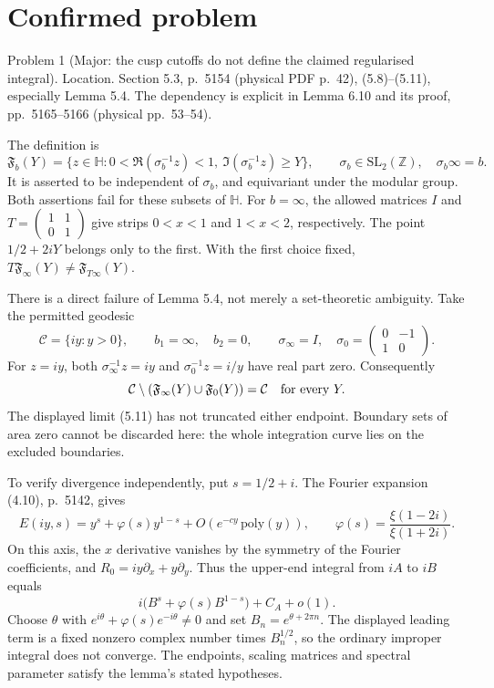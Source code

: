 \documentclass[10pt]{article}
\begin{document}
\section*{Confirmed problem}
Problem 1 (Major: the cusp cutoffs do not define the claimed regularised integral).  Location. Section 5.3, p. 5154 (physical PDF p. 42), (5.8)–(5.11), especially Lemma 5.4. The dependency is explicit in Lemma 6.10 and its proof, pp. 5165–5166 (physical pp. 53–54).\par
The definition is \[\mathfrak F_b(Y)=
 \{z\in\mathbb H:0<\Re(\sigma_b^{-1}z)<1,\
                         \Im(\sigma_b^{-1}z)\ge Y\},
 \qquad \sigma_b\in\mathrm{SL}_2(\mathbb Z),\quad\sigma_b\infty=b.\] It is asserted to be independent of \(\sigma_b\), and equivariant under the modular group. Both assertions fail for these subsets of \(\mathbb H\). For \(b=\infty\), the allowed matrices \(I\) and \(T=\left(\begin{smallmatrix}1&1\\0&1\end{smallmatrix}\right)\) give strips \(0<x<1\) and \(1<x<2\), respectively. The point \(1/2+2iY\) belongs only to the first. With the first choice fixed, \(T\mathfrak F_\infty(Y)\ne\mathfrak F_{T\infty}(Y)\).\par
There is a direct failure of Lemma 5.4, not merely a set-theoretic ambiguity. Take the permitted geodesic \[\mathcal C=\{iy:y>0\},\qquad b_1=\infty,\quad b_2=0,\qquad
 \sigma_\infty=I,\quad
 \sigma_0=\begin{pmatrix}0&-1\\1&0\end{pmatrix}.\] For \(z=iy\), both \(\sigma_\infty^{-1}z=iy\) and \(\sigma_0^{-1}z=i/y\) have real part zero. Consequently \[\mathcal C\setminus
       (\mathfrak F_\infty(Y)\cup\mathfrak F_0(Y))=\mathcal C
 \quad\hbox{for every }Y.\] The displayed limit (5.11) has not truncated either endpoint. Boundary sets of area zero cannot be discarded here: the whole integration curve lies on the excluded boundaries.\par
To verify divergence independently, put \(s=1/2+i\). The Fourier expansion (4.10), p. 5142, gives \[E(iy,s)=y^s+\varphi(s)y^{1-s}+O(e^{-c y}\,\mathrm{poly}(y)),
 \qquad
 \varphi(s)=\frac{\xi(1-2i)}{\xi(1+2i)}.\] On this axis, the \(x\) derivative vanishes by the symmetry of the Fourier coefficients, and \(R_0=iy\partial_x+y\partial_y\). Thus the upper-end integral from \(iA\) to \(iB\) equals \[i\bigl(B^s+\varphi(s)B^{1-s}\bigr)+C_A+o(1).\] Choose \(\theta\) with \(e^{i\theta}+\varphi(s)e^{-i\theta}\ne0\) and set \(B_n=e^{\theta+2\pi n}\). The displayed leading term is a fixed nonzero complex number times \(B_n^{1/2}\), so the ordinary improper integral does not converge. The endpoints, scaling matrices and spectral parameter satisfy the lemma’s stated hypotheses.\par
\end{document}
